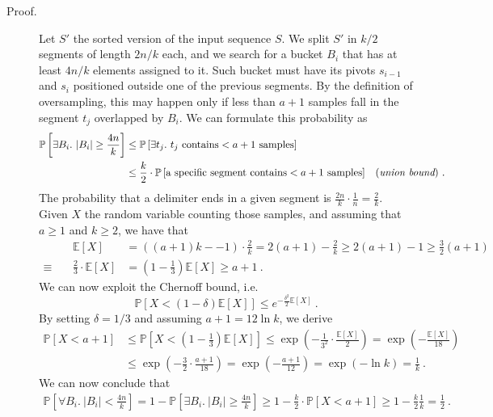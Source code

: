 \begin{enumerate}
\begin{description}
    \item[Proof.] Let $S'$ the sorted version of the input sequence $S$. We
    split $S'$ in $k/2$ segments of length $2n/k$ each, and we search for a
    bucket $B_i$ that has at least $4n/k$ elements assigned to it. Such bucket
    must have its pivots $s_{i-1}$ and $s_i$ positioned outside one of the
    previous segments. By the definition of oversampling, this may happen only
    if less than $a + 1$ samples fall in the segment $t_j$ overlapped by $B_i$.
    We can formulate this probability as
    \begin{align*}
      \mathbb{P}\left[\exists B_i.\ |B_i| \ge \frac{4n}{k} \right] &\le
      \mathbb{P}\left[\exists t_j.\ t_j \text{ contains} < a + 1 \text{ samples}
      \right] && \\ &\le \frac{k}{2}\cdot\mathbb{P}\left[ \text{a specific
      segment contains} < a + 1 \text{ samples} \right] && (\text{\it union
      bound})\ .
    \end{align*}
    The probability that a delimiter ends in a given segment is
    $\frac{2n}{k}\cdot\frac{1}{n} = \frac{2}{k}$. Given $X$ the random variable
    counting those samples, and assuming that $a \ge 1$ and $k \ge 2$, we have
    that
    \begin{align*}
      && \mathbb{E}\left[X\right] &= \left(\left(a + 1 \right)k -
      - 1\right)\cdot \frac{2}{k} = 2\left(a + 1 \right) - \frac{2}{k} \ge
      2\left(a + 1 \right) - 1 \ge \frac{3}{2}\left(a + 1 \right) \\ \equiv\
      && \frac{2}{3}\cdot\mathbb{E}\left[X\right] &= \left(1 -
      \frac{1}{3}\right)\mathbb{E}\left[X\right] \ge a + 1\ .
    \end{align*}
    We can now exploit the Chernoff bound, i.e. $$\mathbb{P}\left[ X < (1 -
    \delta)\mathbb{E}[X] \right] \le e^{-\frac{\delta^2}{2}\mathbb{E}[X]}\ .$$
    By setting $\delta = 1/3$ and assuming $a + 1 = 12\ln k$, we derive
    \begin{align*}
      \mathbb{P}\left[X < a + 1 \right] &\le \mathbb{P}\left[X < \left(1 -
      \frac{1}{3}\right)\mathbb{E}\left[X\right] \right] \le
      \exp\left({-\frac{1}{3^2}\cdot\frac{\mathbb{E}\left[X\right]}{2}}\right) =
      \exp\left({-\frac{\mathbb{E}\left[X\right]}{18}}\right) \\ &\le
      \exp\left({-\frac{3}{2}\cdot\frac{a + 1}{18}}\right) = \exp\left({-\frac{a
      + 1}{12}}\right) = \exp(-\ln k) = \frac{1}{k}\ .
    \end{align*}
    We can now conclude that
    \begin{align*}
      \mathbb{P}\left[\forall B_i.\ |B_i| < \frac{4n}{k} \right] = 1 -
      \mathbb{P}\left[\exists B_i.\ |B_i| \ge \frac{4n}{k} \right] \ge 1 -
      \frac{k}{2}\cdot\mathbb{P}\left[X < a + 1 \right] \ge 1 -
      \frac{k}{2}\frac{1}{k} = \frac{1}{2}\ .
    \end{align*}

  \end{description}

\end{enumerate}
